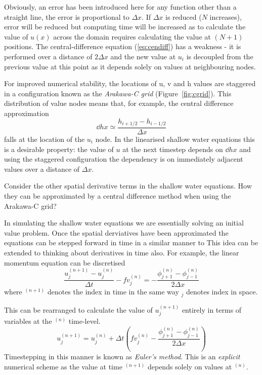 \documentclass[a4paper]{tufte-handout}
\begin{document}
  Obviously, an error has been introduced here for any function other than a
  straight line, the error is proportional to $\Delta x$.
  If $\Delta x$ is reduced ($N$ increases), error will be reduced but computing time will be
  increased as to calculate the value of $u(x)$ across the domain requires
  calculating the value at $(N+1)$ positions.
  The central-difference equation (\ref{eq:cendiff}) has a weakness - it is
  performed over a distance of $2 \Delta x$ and the new value at $u_i$ is
  decoupled from the previous value at this point as it depends solely on
  values at neighbouring nodes.

  For improved numerical stability, the locations of u, v and h values are
  staggered in a configuration known as the \emph{Arakawa-C grid} (Figure~\ref{fig:cgrid}).
  This distribution of value nodes means that, for example, the central difference
  approximation
  \begin{equation}
    \dd{h}{x} \simeq \frac{h_{i+1/2} - h_{i-1/2}}{\Delta x}
  \end{equation}
  falls at the location of the $u_i$ node.
  In the linearised shallow water equations this is a desirable property:
  the value of $u$ at the next timestep depends on $\dd{h}{x}$ and using
  the staggered configuration the dependency is on immediately adjacent values
  over a distance of $\Delta x$.

  Consider the other spatial derivative terms in the shallow water equations.
  How they can be approximated by a central difference method when using the
  Arakawa-C grid?


  In simulating the shallow water equations we are essentially solving
  an initial value problem.
  Once the spatial derviatives have been approximated the equations can
  be stepped forward in time in a similar manner to
  This idea can be extended to thinking about derivatives in time also.
  For example, the linear momentum equation can be discretised
  \begin{equation}
    \frac{u_j^{(n+1)} - u_j^{(n)}}{\Delta t} - fv_j^{(n)} = - \frac{\phi_{j+1}^{(n)} - \phi_{j-1}^{(n)}}{2 \Delta x}
  \end{equation}
  where $^{(n+1)}$ denotes the index in time in the same way $_j$ denotes
  index in space.

  This can be rearranged to calculate the value of $u_j^{(n+1)}$ entirely in
  terms of variables at the $^{(n)}$ time-level.
  \begin{equation}
    u_j^{(n+1)} = u_j^{(n)} + {\Delta t}
      \left( fv_j^{(n)} - \frac{\phi_{j+1}^{(n)} - \phi_{j-1}^{(n)}}{2 \Delta x} \right)
  \end{equation}
  Timestepping in this manner is known as \emph{Euler's method}.
  This is an \emph{explicit} numerical scheme as the value at time $^{(n+1)}$
  depends solely on values at $^{(n)}$.
\end{document}
